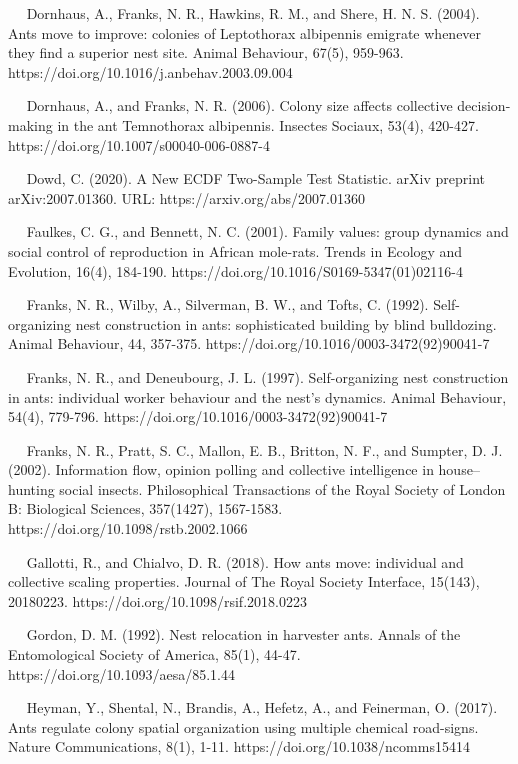 \documentclass[3p]{elsarticle} %
\begin{document}
~~ Dornhaus, A., Franks, N. R., Hawkins, R. M., and Shere, H. N. S.
(2004). Ants move to improve: colonies of Leptothorax albipennis
emigrate whenever they find a superior nest site. Animal Behaviour,
67(5), 959-963. https://doi.org/10.1016/j.anbehav.2003.09.004

~~ Dornhaus, A., and Franks, N. R. (2006). Colony size affects
collective decision-making in the ant Temnothorax albipennis. Insectes
Sociaux, 53(4), 420-427. https://doi.org/10.1007/s00040-006-0887-4

~~ Dowd, C. (2020). A New ECDF Two-Sample Test Statistic. arXiv preprint
arXiv:2007.01360. URL: https://arxiv.org/abs/2007.01360

~~ Faulkes, C. G., and Bennett, N. C. (2001). Family values: group
dynamics and social control of reproduction in African mole-rats. Trends
in Ecology and Evolution, 16(4), 184-190.
https://doi.org/10.1016/S0169-5347(01)02116-4

~~ Franks, N. R., Wilby, A., Silverman, B. W., and Tofts, C. (1992).
Self-organizing nest construction in ants: sophisticated building by
blind bulldozing. Animal Behaviour, 44, 357-375.
https://doi.org/10.1016/0003-3472(92)90041-7

~~ Franks, N. R., and Deneubourg, J. L. (1997). Self-organizing nest
construction in ants: individual worker behaviour and the nest's
dynamics. Animal Behaviour, 54(4), 779-796.
https://doi.org/10.1016/0003-3472(92)90041-7

~~ Franks, N. R., Pratt, S. C., Mallon, E. B., Britton, N. F., and
Sumpter, D. J. (2002). Information flow, opinion polling and collective
intelligence in house--hunting social insects. Philosophical
Transactions of the Royal Society of London B: Biological Sciences,
357(1427), 1567-1583. https://doi.org/10.1098/rstb.2002.1066

~~ Gallotti, R., and Chialvo, D. R. (2018). How ants move: individual
and collective scaling properties. Journal of The Royal Society
Interface, 15(143), 20180223. https://doi.org/10.1098/rsif.2018.0223

~~ Gordon, D. M. (1992). Nest relocation in harvester ants. Annals of
the Entomological Society of America, 85(1), 44-47.
https://doi.org/10.1093/aesa/85.1.44

~~ Heyman, Y., Shental, N., Brandis, A., Hefetz, A., and Feinerman, O.
(2017). Ants regulate colony spatial organization using multiple
chemical road-signs. Nature Communications, 8(1), 1-11.
https://doi.org/10.1038/ncomms15414
\end{document}
